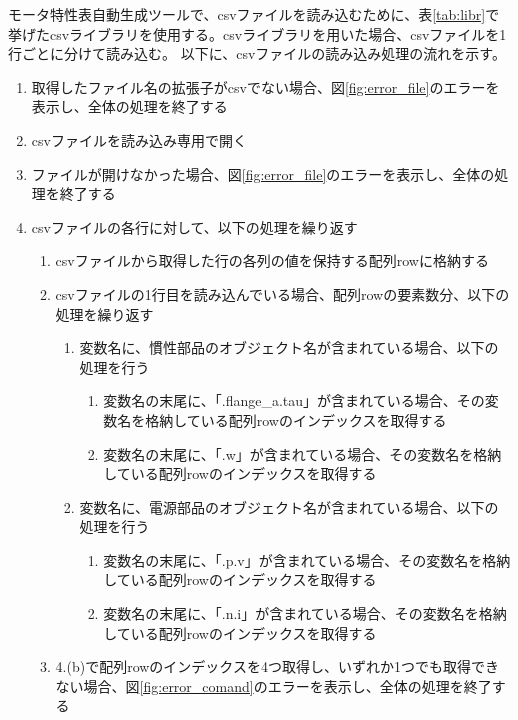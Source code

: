 モータ特性表自動生成ツールで、csvファイルを読み込むために、表\ref{tab:libr}で挙げたcsvライブラリを使用する。csvライブラリを用いた場合、csvファイルを1行ごとに分けて読み込む。
以下に、csvファイルの読み込み処理の流れを示す。
\begin{enumerate}
    \item 取得したファイル名の拡張子がcsvでない場合、図\ref{fig:error_file}のエラーを表示し、全体の処理を終了する
    \item csvファイルを読み込み専用で開く
    \item ファイルが開けなかった場合、図\ref{fig:error_file}のエラーを表示し、全体の処理を終了する
    \item csvファイルの各行に対して、以下の処理を繰り返す
    \begin{enumerate}
        \item csvファイルから取得した行の各列の値を保持する配列rowに格納する
        \item csvファイルの1行目を読み込んでいる場合、配列rowの要素数分、以下の処理を繰り返す
            \begin{enumerate}
                \item 変数名に、慣性部品のオブジェクト名が含まれている場合、以下の処理を行う
                \begin{enumerate}
                    \item 変数名の末尾に、「.flange\_a.tau」が含まれている場合、その変数名を格納している配列rowのインデックスを取得する
                    \item 変数名の末尾に、「.w」が含まれている場合、その変数名を格納している配列rowのインデックスを取得する
                \end{enumerate}
                \item 変数名に、電源部品のオブジェクト名が含まれている場合、以下の処理を行う
                \begin{enumerate}
                    \item 変数名の末尾に、「.p.v」が含まれている場合、その変数名を格納している配列rowのインデックスを取得する
                    \item 変数名の末尾に、「.n.i」が含まれている場合、その変数名を格納している配列rowのインデックスを取得する
                \end{enumerate}
            \end{enumerate}
            \item 4.(b)で配列rowのインデックスを4つ取得し、いずれか1つでも取得できない場合、図\ref{fig:error_comand}のエラーを表示し、全体の処理を終了する
  

\end{enumerate}
\end{enumerate}
